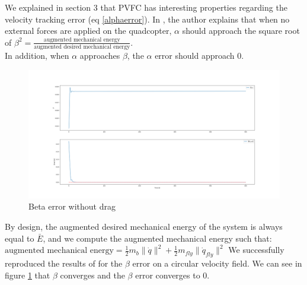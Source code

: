 We explained in section 3 that PVFC has interesting properties regarding the velocity tracking error (eq \ref{alphaerror}). 
In \cite{li1999passive}, the author explains that when no external forces are applied on the quadcopter, $\alpha$ should approach the square root of $\beta^2 = \frac{\text{augmented mechanical energy}}{\text{augmented desired mechanical energy}}$.\\
In addition, when $\alpha$ approaches $\beta$, the $\alpha$ error should approach 0.

\begin{figure}[h!]
   \centering
   \includegraphics[width=\linewidth, scale=1.5]{Images/betaerrornodrag.png}
   \caption{Beta error without drag}
   \label{fig:betaerrornodrag}
\end{figure}
By design, the augmented desired mechanical energy of the system is always equal to $\bar{E}$, and we compute the augmented mechanical energy such that:\\
$\text{augmented mechanical energy} = \frac{1}{2}m_b\lVert\dot{q}\rVert^2 + \frac{1}{2}m_{fly}\lVert\dot{q}_{fly}\rVert^2 $
We successfully reproduced the results of \cite{li1999passive} for the $\beta$ error on a circular velocity field. We can see in figure \ref{fig:betaerrornodrag} that $\beta$ converges and the $\beta$ error converges to 0.

